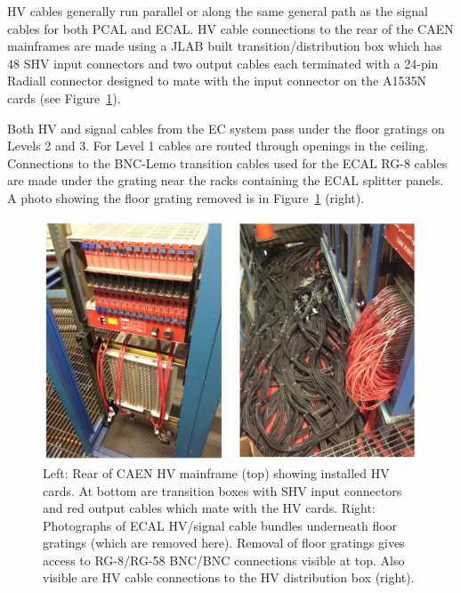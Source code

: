 \documentclass[letterpaper,10pt]{article}
\begin{document}
HV cables generally run parallel or along the same general path as the signal cables for both PCAL and ECAL.
HV cable connections to the rear of the CAEN mainframes are made using a JLAB built transition/distribution
box which has 48 SHV input connectors and two output cables each terminated with a 24-pin Radiall connector
designed to mate with the input connector on the A1535N cards (see Figure~\ref{fc-layout-3}).

Both HV and signal cables from the EC system pass under the floor gratings on Levels 2 and 3.  For Level 1
cables are routed through openings in the ceiling.  Connections to the BNC-Lemo transition cables used for the ECAL
RG-8 cables are made under the grating near the racks containing the ECAL splitter panels.  A photo showing
the floor grating removed is in Figure~\ref{fc-layout-3} (right).

\begin{figure}[htbp]
  \centering
  \includegraphics[width= 6in, keepaspectratio = true]{Cable-routing}
  \vspace{2mm}
  \caption{Left: Rear of CAEN HV mainframe (top) showing installed HV cards.  At bottom are transition
    boxes with SHV input connectors and red output cables which mate with the HV cards.  Right: Photographs
    of ECAL HV/signal cable bundles underneath floor gratings (which are removed here). Removal of floor gratings
    gives access to RG-8/RG-58 BNC/BNC connections visible at top.  Also visible are HV cable connections to
    the HV distribution box (right).}
  \label{fc-layout-3} 
\end{figure}
\end{document}
